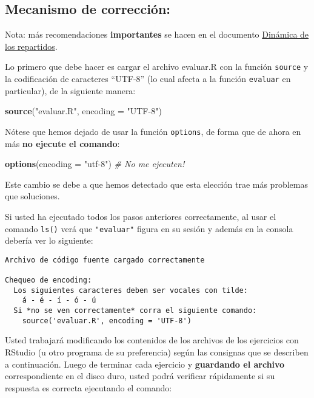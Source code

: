 \documentclass[]{article}
\newenvironment{Shaded}{}{}
\newcommand{\KeywordTok}[1]{\textcolor[rgb]{0.00,0.44,0.13}{\textbf{{#1}}}}
\newcommand{\DataTypeTok}[1]{\textcolor[rgb]{0.56,0.13,0.00}{{#1}}}
\newcommand{\StringTok}[1]{\textcolor[rgb]{0.25,0.44,0.63}{{#1}}}
\newcommand{\CommentTok}[1]{\textcolor[rgb]{0.38,0.63,0.69}{\textit{{#1}}}}
\newcommand{\NormalTok}[1]{{#1}}
\begin{document}
\subsection{Mecanismo de corrección:}

Nota: más recomendaciones \textbf{importantes} se hacen en el documento
\href{http://goo.gl/P5Wnq}{Dinámica de los repartidos}.

Lo primero que debe hacer es cargar el archivo evaluar.R con la función
\texttt{source} y la codificación de caracteres ``UTF-8'' (lo cual
afecta a la función \texttt{evaluar} en particular), de la siguiente
manera:

\begin{Shaded}
\begin{Highlighting}[]
\KeywordTok{source}\NormalTok{(}\StringTok{"evaluar.R"}\NormalTok{, }\DataTypeTok{encoding =} \StringTok{"UTF-8"}\NormalTok{)}
\end{Highlighting}
\end{Shaded}

Nótese que hemos dejado de usar la función \texttt{options}, de forma
que de ahora en más \textbf{no ejecute el comando}:

\begin{Shaded}
\begin{Highlighting}[]
\KeywordTok{options}\NormalTok{(}\DataTypeTok{encoding =} \StringTok{"utf-8"}\NormalTok{)  }\CommentTok{# No me ejecuten!}
\end{Highlighting}
\end{Shaded}

Este cambio se debe a que hemos detectado que esta elección trae más
problemas que soluciones.

Si usted ha ejecutado todos los pasos anteriores correctamente, al usar
el comando \texttt{ls()} verá que \texttt{"evaluar"} figura en su sesión
y además en la consola debería ver lo siguiente:

\begin{verbatim}
Archivo de código fuente cargado correctamente

Chequeo de encoding:
  Los siguientes caracteres deben ser vocales con tilde:
    á - é - í - ó - ú
  Si *no se ven correctamente* corra el siguiente comando:
    source('evaluar.R', encoding = 'UTF-8')
\end{verbatim}

Usted trabajará modificando los contenidos de los archivos de los
ejercicios con RStudio (u otro programa de su preferencia) según las
consignas que se describen a continuación. Luego de terminar cada
ejercicio y \textbf{guardando el archivo} correspondiente en el disco
duro, usted podrá verificar rápidamente si su respuesta es correcta
ejecutando el comando:
\end{document}
